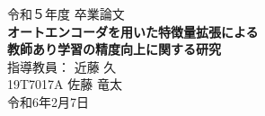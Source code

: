 \thispagestyle{empty}
\begin{center}
  \vspace*{20mm}
  {\LARGE 令和５年度 卒業論文\\}
  \vfill
  \textbf{{\huge オートエンコーダを用いた特徴量拡張による\\教師あり学習の精度向上に関する研究\\}}
  \vfill
  {\LARGE 指導教員： 近藤 久\\}
  \vfill
  {\LARGE 19T7017A   佐藤 竜太\\}
  \vfill
  {\LARGE 令和6年2月7日\\}
  \vspace*{20mm}
\end{center}
\newpage
